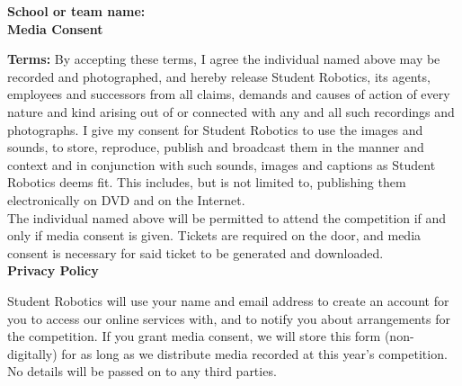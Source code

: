 \documentclass[a4paper,10pt]{article}
\newcommand{\textfield}[1]{\textbf{#1:} \hrulefill\hspace{0mm}}
\newcommand{\fieldsep}{\\[2.5mm]}
\begin{document}
\textfield{School or team name} \fieldsep


\textbf{\large Media Consent}\\\vspace{-3mm}

\textbf{Terms:} By accepting these terms, I agree the individual named above may be recorded and photographed, and hereby release Student Robotics, its agents, employees and successors from all claims, demands and causes of action of every nature and kind arising out of or connected with any and all such recordings and photographs.
I give my consent for Student Robotics to use the images and sounds, to store, reproduce, publish and broadcast them in the manner and context and in conjunction with such sounds, images and captions as Student Robotics deems fit.
This includes, but is not limited to, publishing them electronically on DVD and on the Internet.\\

The individual named above will be permitted to attend the competition if and only if media consent is given.
Tickets are required on the door, and media consent is necessary for said ticket to be generated and downloaded.\\


\textbf{\large Privacy Policy}\\\vspace{-3mm}

Student Robotics will use your name and email address to create an account for you to access our online services with, and to notify you about arrangements for the competition.
If you grant media consent, we will store this form (non-digitally) for as long as we distribute media recorded at this year's competition.
No details will be passed on to any third parties. \\
\end{document}
